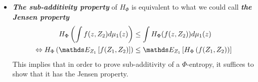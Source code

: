 \documentclass[11pt]{article}
\begin{document}
\begin{itemize}
%

\item \begin{remark}
\emph{\textbf{The sub-additivity property}} of $H_{\Phi}$ is equivalent to what we could call \emph{\textbf{the Jensen property}}
\begin{align}
H_{\Phi}\paren{\int f(z, Z_2)d\mu_1(z)} &\le \int H_{\Phi}(f(z, Z_2)) d\mu_1(z) \nonumber\\
\Leftrightarrow H_{\Phi}\paren{\E{Z_1}{f(Z_1, Z_2)}} &\le \E{Z_1}{H_{\Phi}\paren{f(Z_1, Z_2)}} \label{eqn: sub_additivity_phi_entropy_general_proof_1}
\end{align}
This implies that in order to prove sub-additivity of a $\Phi$-entropy, it
suffices to show that it has the Jensen property.
\end{remark}

\end{itemize}
\end{document}
